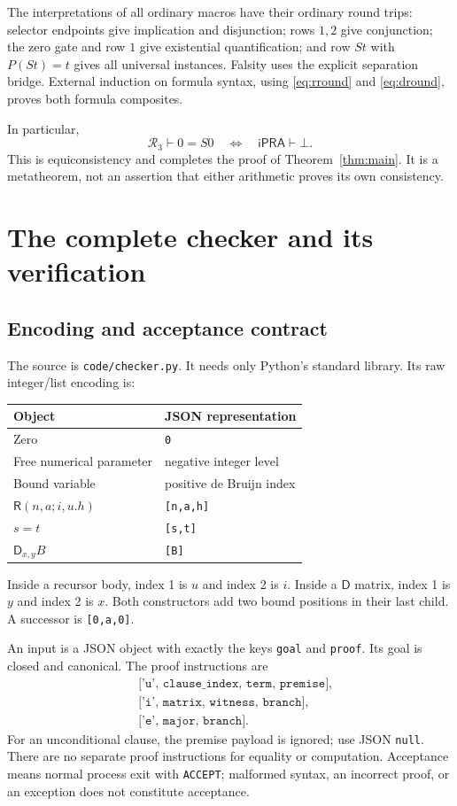 \documentclass[11pt]{article}
\theoremstyle{definition}
\theoremstyle{remark}
\newcommand{\R}{\mathsf R}
\newcommand{\D}{\mathsf D}
\newcommand{\K}{\mathcal R_3}
\newcommand{\ipra}{\mathsf{iPRA}}
\newcommand{\der}{\vdash}
\begin{document}
The interpretations of all ordinary
macros have their ordinary round trips:
selector endpoints give implication
and disjunction; rows $1,2$ give
conjunction; the zero gate and row $1$
give existential quantification; and
row $St$ with $P(St)=t$ gives all
universal instances. Falsity uses the
explicit separation bridge.
External induction on formula syntax,
using \eqref{eq:rround} and
\eqref{eq:dround}, proves both
formula composites.

In particular,
\[
 \K\der 0=S0
 \quad\Longleftrightarrow\quad
 \ipra\der\bot.
\]
This is equiconsistency and completes
the proof of Theorem~\ref{thm:main}.
It is a metatheorem, not an assertion
that either arithmetic proves its
own consistency.

\section{The complete checker and its verification}
\label{sec:implementation}

\subsection{Encoding and acceptance contract}

The source is \texttt{code/checker.py}.
It needs only Python's standard library.
Its raw integer/list encoding is:
\begin{center}
\begin{tabular}{@{}ll@{}}
\toprule
Object & JSON representation\\
\midrule
Zero & \texttt{0}\\
Free numerical parameter & negative integer level\\
Bound variable & positive de Bruijn index\\
$\R(n,a;i,u.h)$ & \texttt{[n,a,h]}\\
$s=t$ & \texttt{[s,t]}\\
$\D_{x,y}B$ & \texttt{[B]}\\
\bottomrule
\end{tabular}
\end{center}
Inside a recursor body, index 1 is $u$
and index 2 is $i$. Inside a $\D$
matrix, index 1 is $y$ and index 2
is $x$. Both constructors add two
bound positions in their last child.
A successor is \texttt{[0,a,0]}.

An input is a JSON object with exactly
the keys \texttt{goal} and \texttt{proof}.
Its goal is closed and canonical.
The proof instructions are
\begin{align*}
 &\texttt{['u', clause\_index, term, premise]},\\
 &\texttt{['i', matrix, witness, branch]},\\
 &\texttt{['e', major, branch]}.
\end{align*}
For an unconditional clause, the premise
payload is ignored; use JSON \texttt{null}.
There are no separate proof instructions
for equality or computation.
Acceptance means normal process exit
with \texttt{ACCEPT}; malformed syntax,
an incorrect proof, or an exception does
not constitute acceptance.
\end{document}
